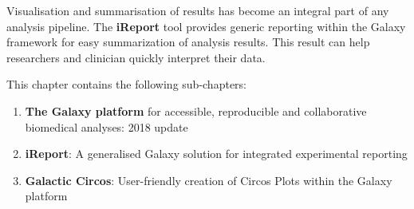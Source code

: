 Visualisation and summarisation of results has become an integral part of any analysis pipeline. The \textbf{iReport} tool provides generic reporting within the Galaxy framework for easy summarization of analysis results. This result can help researchers and clinician quickly interpret their data.


This chapter contains the following sub-chapters:

\begin{enumerate}[label=\ref{chapter:general}.\arabic*]
\itemsep-0.5em
\setcounter{enumi}{-1}
\item \textbf{The Galaxy platform} for accessible, reproducible and collaborative biomedical analyses: 2018 update
\item \textbf{iReport}: A generalised Galaxy solution for integrated experimental reporting
\item \textbf{Galactic Circos}: User-friendly creation of Circos Plots within the Galaxy platform
\end{enumerate}

